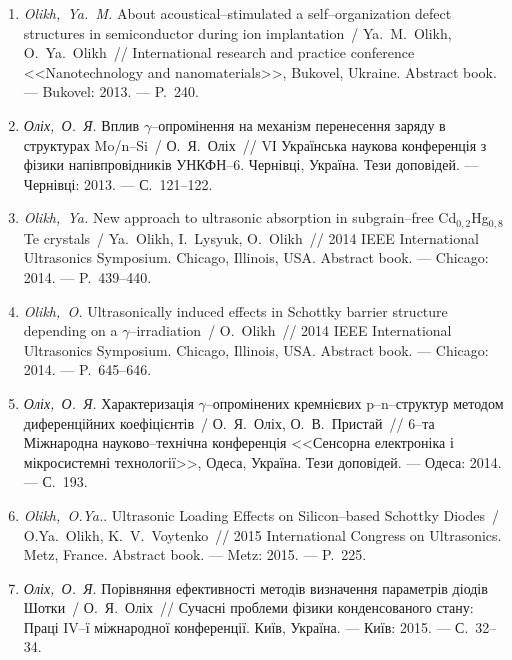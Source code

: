 \begin{enumerate}[label=\arabic*.,leftmargin=2em,itemindent=0cm]
\item
\emph{Olikh,~Ya.~M.} About acoustical--stimulated a self--organization
  defect structures in semiconductor during ion implantation~/ Ya.~M.~Olikh,
  O.~Ya.~Olikh~// International research and practice conference
  <<Nanotechnology and nanomaterials>>, {B}ukovel, {U}kraine. Abstract book.
  ---
  Bukovel: 2013. ---
  P.~240.

\item
\emph{Оліх,~О.~Я.} Вплив $\gamma$--опромінення на
  механізм перенесення заряду в структурах
  Mo/n--Si~/ О.~Я.~Оліх~// {VІ} {У}країнська наукова
  конференція з фізики напівпровідників
  {УНКФН}--6. Чернівці, {У}країна. Тези
  доповідей. ---
  Чернівці: 2013. ---
  {С.}~121--122.

\item
\emph{Olikh,~Ya.} New approach to ultrasonic absorption in subgrain--free
  {C}d$_{0,2}${H}g$_{0,8}${T}e crystals~/ Ya.~Olikh, I.~Lysyuk, O.~Olikh~//
  2014 {IEEE} {I}nternational {U}ltrasonics {S}ymposium. Chicago, {I}llinois,
  {USA}. Abstract book. ---
  Chicago: 2014. ---
  P.~439--440.

\item
\emph{Olikh,~O.} Ultrasonically induced effects in {S}chottky barrier
  structure depending on a $\gamma$--irradiation~/ O.~Olikh~// 2014 {IEEE}
  {I}nternational {U}ltrasonics {S}ymposium. Chicago, {I}llinois, {USA}.
  Abstract book. ---
  Chicago: 2014. ---
  P.~645--646.

\item
\emph{Оліх,~О.~Я.} Характеризація
  $\gamma$--опромінених кремнієвих p--n--структур
  методом диференційних коефіцієнтів~/
  О.~Я.~Оліх, О.~В.~Пристай~// 6--та Міжнародна
  науково--технічна конференція <<{С}енсорна
  електроніка і мікросистемні технології>>,
  {О}деса, {У}країна. Тези доповідей. ---
  Одеса: 2014. ---
  {С.}~193.

\item
\emph{Olikh,~O.Ya.}. Ultrasonic Loading Effects on Silicon--based Schottky
  Diodes~/ O.Ya.~Olikh, K.~V.~Voytenko~// 2015 {I}nternational {C}ongress on
  {U}ltrasonics. Metz, {F}rance. Abstract book. ---
  Metz: 2015. ---
  P.~225.

\item
\emph{Оліх,~О.~Я.} Порівняння ефективності
  методів визначення параметрів діодів
  {Ш}отки~/ О.~Я.~Оліх~// Сучасні проблеми
  фізики конденсованого стану: {П}раці {IV}--ї
  міжнародної конференції. {К}иїв, {У}країна.
  ---
  Київ: 2015. ---
  {С.}~32--34.


\end{enumerate}

